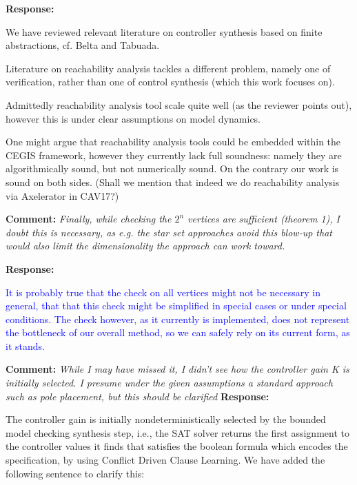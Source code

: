 \documentclass{article}
\newcommand{\rev}[1]{\textcolor{blue}{#1}}
\begin{document}
\vspace{1em}
{\bf Response: }

We have reviewed relevant literature on controller synthesis based on finite abstractions, cf. Belta and Tabuada. 

Literature on reachability analysis tackles a different problem, namely one of verification, rather than one of control synthesis (which this work focuses on). 

Admittedly reachability analysis tool scale quite well (as the reviewer points out), however this is under clear assumptions on model dynamics. 

One might argue that reachability analysis tools could be embedded within the CEGIS framework, however they currently lack full soundness: namely they are algorithmically sound, but not numerically sound. On the contrary our work is sound on both sides. (Shall we mention that indeed we do reachability analysis via Axelerator in CAV17?)

\vspace{2em}
{\bf Comment: }
{\itshape Finally, while checking the $2^n$ vertices
are sufficient (theorem 1), I doubt this is necessary, as e.g. the star set approaches avoid this blow-up that would also limit the dimensionality
the approach can work toward.}
\vspace{1em}

{\bf Response: }

\rev{It is probably true that the check on all vertices might not be necessary in general, that that this check might be simplified in special cases or under special conditions. The check however, as it currently is implemented, does not represent the bottleneck of our overall method, so we can safely rely on its current form, as it stands. }

\vspace{2em}

{\bf Comment: }
{\itshape While I may have missed it, I didn't see how the controller gain K is initially selected. I presume under the given assumptions a standard approach
such as pole placement, but this should be clarified}
\vspace{1em}
{\bf Response: }

The controller gain is initially nondeterministically selected by the bounded model checking synthesis step, i.e., the SAT solver returns the first assignment to the controller
values it finds
that satisfies the boolean formula which encodes the specification, by using Conflict Driven Clause Learning.
We have added the following sentence to clarify this:
\end{document}
